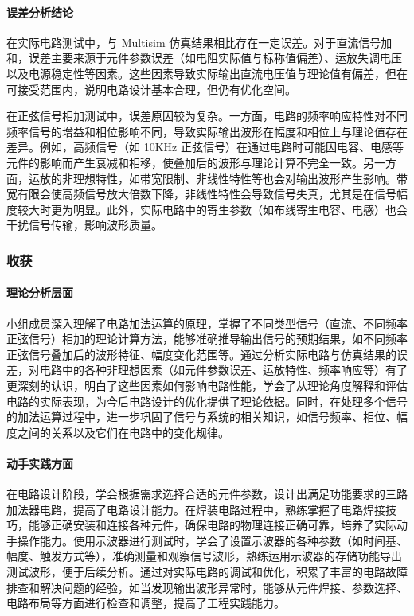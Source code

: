 \documentclass[./测控三级项目.tex]{subfiles} %
\begin{document}
		\paragraph{\qquad 误差分析结论}
		在实际电路测试中，与 Multisim 仿真结果相比存在一定误差。对于直流信号加和，误差主要来源于元件参数误差（如电阻实际值与标称值偏差）、运放失调电压以及电源稳定性等因素。这些因素导致实际输出直流电压值与理论值有偏差，但在可接受范围内，说明电路设计基本合理，但仍有优化空间。\par
		在正弦信号相加测试中，误差原因较为复杂。一方面，电路的频率响应特性对不同频率信号的增益和相位影响不同，导致实际输出波形在幅度和相位上与理论值存在差异。例如，高频信号（如 10KHz 正弦信号）在通过电路时可能因电容、电感等元件的影响而产生衰减和相移，使叠加后的波形与理论计算不完全一致。另一方面，运放的非理想特性，如带宽限制、非线性特性等也会对输出波形产生影响。带宽有限会使高频信号放大倍数下降，非线性特性会导致信号失真，尤其是在信号幅度较大时更为明显。此外，实际电路中的寄生参数（如布线寄生电容、电感）也会干扰信号传输，影响波形质量。
		\subsubsection{收获}
		\paragraph{\qquad 理论分析层面}
		小组成员深入理解了电路加法运算的原理，掌握了不同类型信号（直流、不同频率正弦信号）相加的理论计算方法，能够准确推导输出信号的预期结果，如不同频率正弦信号叠加后的波形特征、幅度变化范围等。通过分析实际电路与仿真结果的误差，对电路中的各种非理想因素（如元件参数误差、运放特性、频率响应等）有了更深刻的认识，明白了这些因素如何影响电路性能，学会了从理论角度解释和评估电路的实际表现，为今后电路设计的优化提供了理论依据。同时，在处理多个信号的加法运算过程中，进一步巩固了信号与系统的相关知识，如信号频率、相位、幅度之间的关系以及它们在电路中的变化规律。
		\paragraph{\qquad 动手实践方面}
		在电路设计阶段，学会根据需求选择合适的元件参数，设计出满足功能要求的三路加法器电路，提高了电路设计能力。在焊装电路过程中，熟练掌握了电路焊接技巧，能够正确安装和连接各种元件，确保电路的物理连接正确可靠，培养了实际动手操作能力。使用示波器进行测试时，学会了设置示波器的各种参数（如时间基、幅度、触发方式等），准确测量和观察信号波形，熟练运用示波器的存储功能导出测试波形，便于后续分析。通过对实际电路的调试和优化，积累了丰富的电路故障排查和解决问题的经验，如当发现输出波形异常时，能够从元件焊接、参数选择、电路布局等方面进行检查和调整，提高了工程实践能力。
\end{document}
